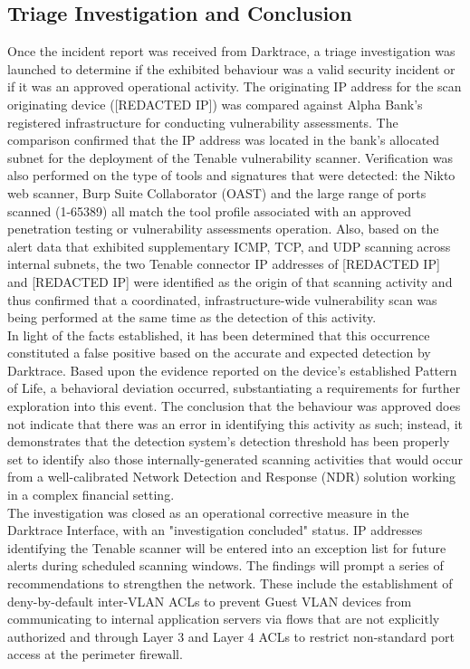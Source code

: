 \documentclass[12pt,a4paper]{report}
\begin{document}
\subsection{Triage Investigation and Conclusion}
Once the incident report was received from Darktrace, a triage investigation was launched to determine if the exhibited behaviour was a valid security incident or if it was an approved operational activity. The originating IP address for the scan originating device ([REDACTED IP]) was compared against Alpha Bank’s registered infrastructure for conducting vulnerability assessments. The comparison confirmed that the IP address was located in the bank’s allocated subnet for the deployment of the Tenable vulnerability scanner. Verification was also performed on the type of tools and signatures that were detected: the Nikto web scanner, Burp Suite Collaborator (OAST) and the large range of ports scanned (1-65389) all match the tool profile associated with an approved penetration testing or vulnerability assessments operation. Also, based on the alert data that exhibited supplementary ICMP, TCP, and UDP scanning across internal subnets, the two Tenable connector IP addresses of [REDACTED IP] and [REDACTED IP] were identified as the origin of that scanning activity and thus confirmed that a coordinated, infrastructure-wide vulnerability scan was being performed at the same time as the detection of this activity.\\

In light of the facts established, it has been determined that this occurrence constituted a false positive based on the accurate and expected detection by Darktrace. Based upon the evidence reported on the device's established Pattern of Life, a behavioral deviation occurred, substantiating a requirements for further exploration into this event. The conclusion that the behaviour was approved does not indicate that there was an error in identifying this activity as such; instead, it demonstrates that the detection system's detection threshold has been properly set to identify also those internally-generated scanning activities that would occur from a well-calibrated Network Detection and Response (NDR) solution working in a complex financial setting.\\

The investigation was closed as an operational corrective measure in the Darktrace Interface, with an "investigation concluded" status. IP addresses identifying the Tenable scanner will be entered into an exception list for future alerts during scheduled scanning windows. The findings will prompt a series of recommendations to strengthen the network. These include the establishment of deny-by-default inter-VLAN ACLs to prevent Guest VLAN devices from communicating to internal application servers via flows that are not explicitly authorized and through Layer 3 and Layer 4 ACLs to restrict non-standard port access at the perimeter firewall.
\end{document}
